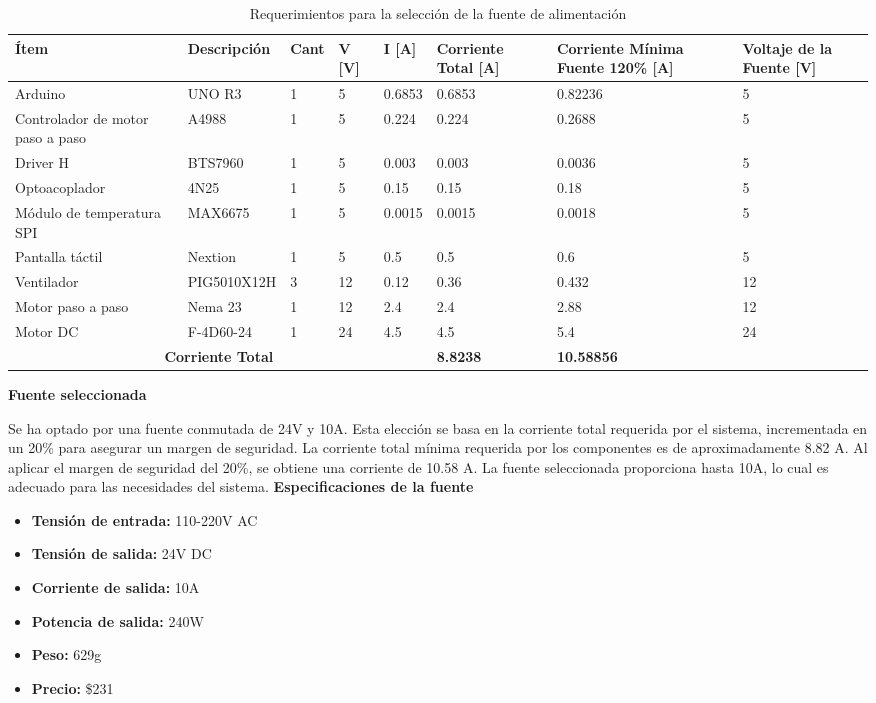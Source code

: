 \documentclass[14pt,oneside]{extarticle} %
\begin{document}
\begin{table}[h!]
\centering
\begin{tabular}{|p{2.5cm}|p{2.6cm}|p{1cm}|p{1cm}|p{1cm}|p{2cm}|p{2cm}|p{1.5cm}|}
\hline
\textbf{Ítem} & \textbf{Descripción} & \textbf{Cant} & \textbf{V [V]} & \textbf{I [A]} & \textbf{Corriente Total [A]} & \textbf{Corriente Mínima Fuente 120\% [A]} & \textbf{Voltaje de la Fuente [V]} \\ \hline
Arduino & UNO R3 & 1 & 5 & 0.6853 & 0.6853 & 0.82236 & 5 \\ \hline
Controlador de motor paso a paso & A4988 & 1 & 5 & 0.224 & 0.224 & 0.2688 & 5 \\ \hline
Driver H & BTS7960 & 1 & 5 & 0.003 & 0.003 & 0.0036 & 5 \\ \hline
Optoacoplador & 4N25 & 1 & 5 & 0.15 & 0.15 & 0.18 & 5 \\ \hline
Módulo de temperatura SPI & MAX6675 & 1 & 5 & 0.0015 & 0.0015 & 0.0018 & 5 \\ \hline
Pantalla táctil & Nextion & 1 & 5 & 0.5 & 0.5 & 0.6 & 5 \\ \hline
Ventilador & PIG5010X12H & 3 & 12 & 0.12 & 0.36 & 0.432 & 12 \\ \hline
Motor paso a paso & Nema 23 & 1 & 12 & 2.4 & 2.4 & 2.88 & 12 \\ \hline
Motor DC & F-4D60-24 & 1 & 24 & 4.5 & 4.5 & 5.4 & 24 \\ \hline
\multicolumn{5}{|c|}{\textbf{Corriente Total}} & \textbf{8.8238} & \textbf{10.58856} & \\ \hline
\end{tabular}
\caption{Requerimientos para la selección de la fuente de alimentación}
\label{tab:Fuente}
\end{table}

\newpage
\textbf{Fuente seleccionada}

Se ha optado por una fuente conmutada de 24V y 10A. Esta elección se basa en la corriente total requerida por el sistema, incrementada en un 20\% para asegurar un margen de seguridad. La corriente total mínima requerida por los componentes es de aproximadamente 8.82 A. Al aplicar el margen de seguridad del 20\%, se obtiene una corriente de 10.58 A. La fuente seleccionada proporciona hasta 10A, lo cual es adecuado para las necesidades del sistema.
\newpage
\textbf{Especificaciones de la fuente}
\begin{itemize}
    \item \textbf{Tensión de entrada:} 110-220V AC
    \item \textbf{Tensión de salida:} 24V DC
    \item \textbf{Corriente de salida:} 10A
    \item \textbf{Potencia de salida:} 240W
    \item \textbf{Peso:} 629g
    \item \textbf{Precio:} \$231
\end{itemize}
\end{document}
